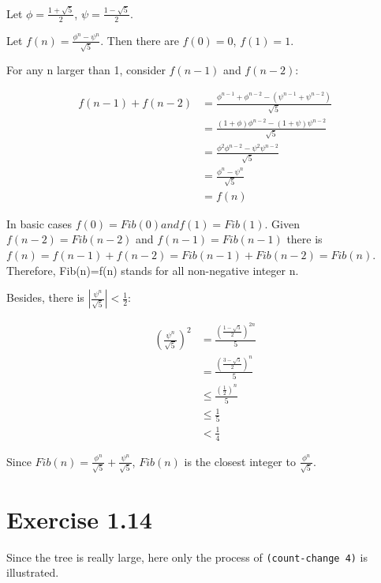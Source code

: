 \documentclass[../main.tex]{subfiles}
\begin{document}
Let $\phi = \frac{1 + \sqrt{5}}{2}$, $\psi = \frac{1 - \sqrt{5}}{2}$.

Let $f(n) = \frac{\phi ^ n - \psi ^ n}{\sqrt{5}}$. Then there are $f(0) = 0$, $f(1) = 1$.

For any n larger than 1, consider $f(n - 1)$ and $f(n - 2)$:

\begin{align*}
f(n-1) + f(n-2) &= \frac{\phi^{n-1} + \phi^{n-2}-(\psi^{n-1}+\psi^{n-2})}{\sqrt{5}} \\
                &= \frac{(1+\phi)\phi^{n-2}-(1+\psi)\psi^{n-2}}{\sqrt{5}} \\
                &= \frac{\phi^2\phi^{n-2}-\psi^2\psi^{n-2}}{\sqrt{5}} \\
                &= \frac{\phi^n-\psi^n}{\sqrt{5}} \\
                &= f(n)
\end{align*}

In basic cases $f(0)=Fib(0) and f(1)=Fib(1)$. Given $f(n-2)=Fib(n-2)$ and
 $f(n-1)=Fib(n-1)$ there is
 $f(n)=f(n-1)+f(n-2)=Fib(n-1)+Fib(n-2)=Fib(n)$. Therefore, Fib(n)=f(n)
 stands for all non-negative integer n.

Besides, there is $\left|\frac{\psi^n}{\sqrt{5}}\right|<\frac{1}{2}$:

\begin{align*}
\left({\frac{\psi^n}{\sqrt{5}}}\right)^2 &= \frac{\left({\frac{1-\sqrt{5}}{2}}\right)^{2n}}{5} \\
&= \frac{\left({\frac{3-\sqrt{5}}{2}}\right)^{n}}{5} \\
&\leq \frac{\left(\frac{1}{2}\right)^n}{5} \\
&\leq \frac{1}{5} \\
&< \frac{1}{4}
\end{align*}

Since $Fib(n)=\frac{\phi^n}{\sqrt{5}}+\frac{\psi^n}{\sqrt{5}}$, $Fib(n)$ is the closest
 integer to $\frac{\phi^n}{\sqrt{5}}$.

\section{Exercise 1.14}

Since the tree is really large, here only the process of \lstinline{(count-change 4)} is illustrated.
\end{document}
